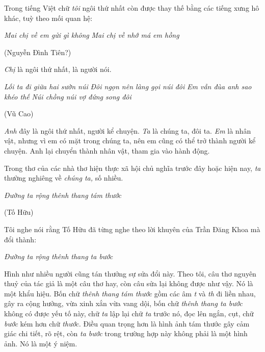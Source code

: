 \documentclass[../main.tex]{subfiles}
\begin{document}
\begin{multicols}{2}
Trong tiếng Việt chữ \textit{tôi} ngôi thứ nhất còn được thay thế bằng các tiếng xưng hô khác, tuỳ theo mối quan hệ: 
\begin{blockquote}
        
\textit{Mai chị về em gửi gì không} 
\textit{Mai chị về nhớ má em hồng} 
        
(Nguyễn Đình Tiên?) 

\end{blockquote}
 
\textit{Chị} là ngôi thứ nhất, là người nói.  
\begin{blockquote}
        
\textit{Lối ta đi giữa hai sườn núi}        
\textit{Đôi ngọn nên làng gọi núi đôi}        
\textit{Em vẫn đùa anh sao khéo thế} 
\textit{Núi chồng núi vợ đứng song đôi} 
        
(Vũ Cao) 

\end{blockquote}
 
\textit{Anh} đây là ngôi thứ nhất, người kể chuyện. \textit{Ta} là chúng ta, đôi ta. \textit{Em} là nhân vật, nhưng vì em có mặt trong chúng ta, nên em cũng có thể trở thành người kể chuyện. Anh lại chuyển thành nhân vật, tham gia vào hành động. 
 
Trong thơ của các nhà thơ hiện thực xã hội chủ nghĩa trước đây hoặc hiện nay, \textit{ta }thường nghiêng về \textit{chúng ta, }số nhiều.  
\begin{blockquote}
        
\textit{Đường ta rộng thênh thang tám thước}        
        
(Tố Hữu) 

\end{blockquote}
 
Tôi nghe nói rằng Tố Hữu đã từng nghe theo lời khuyên của Trần Đăng Khoa mà đổi thành: 
\begin{blockquote}
 
\textit{Đường ta rộng thênh thang ta bước} 

\end{blockquote}
 
Hình như nhiều người cũng tán thưởng sự sửa đổi này. Theo tôi, câu thơ nguyên thuỷ của tác giả là một câu thơ hay, còn câu sửa lại không được như vậy. Nó là một khẩu hiệu. Bốn chữ \textit{thênh thang tám thước }gồm các âm \textit{t }và \textit{th} đi liền nhau, gây ra cộng hưởng, vừa xinh xắn vừa vang dội, bốn chữ \textit{thênh thang ta bước }không có được yếu tố này, chữ \textit{ta }lập lại chữ \textit{ta }trước nó, đọc lên ngắn, cụt, chữ \textit{bước }kém hơn chữ \textit{thước. }Điều quan trọng hơn là hình ảnh tám thước gây cảm giác chi tiết, rõ rệt, còn \textit{ta bước }trong trường hợp này không phải là một hình ảnh. Nó là một ý niệm. 
 

\end{multicols}
\end{document}
